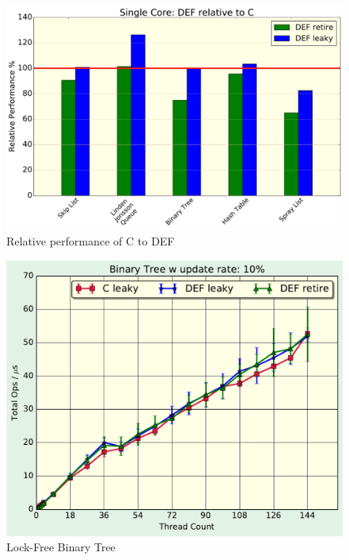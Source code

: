 \begin{figure}
\includegraphics[scale=0.4]{gfx/RelativePerf.pdf}
\caption{Relative performance of C to DEF}
\label{fig:relativeperf}
\end{figure}

\begin{figure}
\includegraphics[scale=.4]{gfx/BinaryTreeLight.pdf}
\caption{Lock-Free Binary Tree}
\label{fig:bintreelight}
\end{figure}

